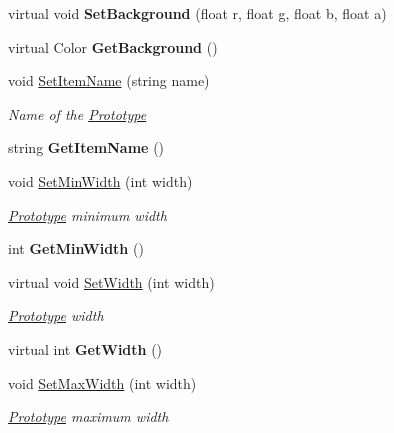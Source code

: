 \begin{DoxyCompactItemize}
virtual void {\bfseries Set\+Background} (float r, float g, float b, float a)
\item 
\mbox{\label{class_space_v_i_l_1_1_prototype_a3aa267258c8a67b527b1e1c20a664023}} 
virtual Color {\bfseries Get\+Background} ()
\item 
void \mbox{\hyperlink{class_space_v_i_l_1_1_prototype_aa4827992b9c7a63aebec49322a7b862f}{Set\+Item\+Name}} (string name)
\begin{DoxyCompactList}\small\item\em Name of the \mbox{\hyperlink{class_space_v_i_l_1_1_prototype}{Prototype}} \end{DoxyCompactList}\item 
\mbox{\label{class_space_v_i_l_1_1_prototype_a490ea197ee9b8e5149e9026290df980d}} 
string {\bfseries Get\+Item\+Name} ()
\item 
void \mbox{\hyperlink{class_space_v_i_l_1_1_prototype_a9594f8484683ec450e8ce20b0c5fad1c}{Set\+Min\+Width}} (int width)
\begin{DoxyCompactList}\small\item\em \mbox{\hyperlink{class_space_v_i_l_1_1_prototype}{Prototype}} minimum width \end{DoxyCompactList}\item 
\mbox{\label{class_space_v_i_l_1_1_prototype_ab35e60e5273dfae718f0ea29498e15c6}} 
int {\bfseries Get\+Min\+Width} ()
\item 
virtual void \mbox{\hyperlink{class_space_v_i_l_1_1_prototype_a6a4f1b9581f4d18f1c3a3e287d4b2a2b}{Set\+Width}} (int width)
\begin{DoxyCompactList}\small\item\em \mbox{\hyperlink{class_space_v_i_l_1_1_prototype}{Prototype}} width \end{DoxyCompactList}\item 
\mbox{\label{class_space_v_i_l_1_1_prototype_aafff1961c4b80b3745410834d6cc2e88}} 
virtual int {\bfseries Get\+Width} ()
\item 
void \mbox{\hyperlink{class_space_v_i_l_1_1_prototype_afb5b3eade68537c29e07b3da28782e96}{Set\+Max\+Width}} (int width)
\begin{DoxyCompactList}\small\item\em \mbox{\hyperlink{class_space_v_i_l_1_1_prototype}{Prototype}} maximum width \end{DoxyCompactList}\item 

\end{DoxyCompactItemize}
